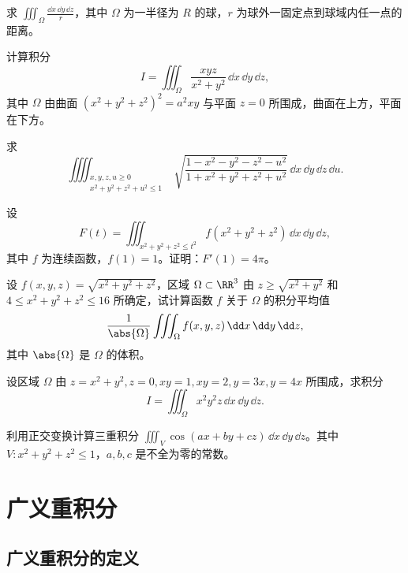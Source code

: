 \begin{xexercise}[5]
求 $\displaystyle\iiint_\Omega\frac{\dd x\,\dd y\,\dd z}{r}$，其中 $\Omega$ 为一半径为 $R$ 的球，$r$ 为球外一固定点到球域内任一点的距离。
\end{xexercise}

\begin{xexercise}[6]
计算积分
  \[
    I=\iiint_\Omega\frac{xyz}{x^2+y^2}\,\dd x\,\dd y\,\dd z,
  \]
  其中 $\Omega$ 由曲面 $(x^2+y^2+z^2)^2=a^2xy$ 与平面 $z=0$ 所围成，曲面在上方，平面在下方。
\end{xexercise}

\begin{xexercise}[7]
求
  \[
    \iiiint_{\substack{x,y,z,u\ge0\\x^2+y^2+z^2+u^2\le1}}
    \sqrt{\frac{1-x^2-y^2-z^2-u^2}{1+x^2+y^2+z^2+u^2}}\,\dd x\,\dd y\,\dd z\,\dd u.
  \]
\end{xexercise}

\begin{xexercise}[8]
设
  \[
    F(t)=\iiint_{x^2+y^2+z^2\le t^2}f(x^2+y^2+z^2)\,\dd x\,\dd y\,\dd z,
  \]
  其中 $f$ 为连续函数，$f(1)=1$。证明：$F'(1)=4\pi$。
\end{xexercise}

\begin{xexercise}[9]
设 $f(x,y,z)=\sqrt{x^2+y^2+z^2}$，区域 $\Omega\subset\RR^3$ 由 $z\ge\sqrt{x^2+y^2}$ 和 $4\le x^2+y^2+z^2\le16$ 所确定，试计算函数 $f$ 关于 $\Omega$ 的积分平均值
  \[
    \frac1{\abs{\Omega}}\iiint_\Omega f(x,y,z)\,\dd x\,\dd y\,\dd z,
  \]
  其中 $\abs{\Omega}$ 是 $\Omega$ 的体积。
\end{xexercise}

\begin{xexercise}[10]
设区域 $\Omega$ 由 $z=x^2+y^2,z=0,xy=1,xy=2,y=3x,y=4x$ 所围成，求积分
  \[
    I=\iiint_\Omega x^2y^2z\,\dd x\,\dd y\,\dd z.
  \]
\end{xexercise}

\begin{xexercise}[11]
利用正交变换计算三重积分 $\displaystyle\iiint_V\cos(ax+by+cz)\,\dd x\,\dd y\,\dd z$。其中 $V\colon x^2+y^2+z^2\le1$，$a,b,c$ 是不全为零的常数。
\end{xexercise}

\section{广义重积分}

\subsection{广义重积分的定义}

